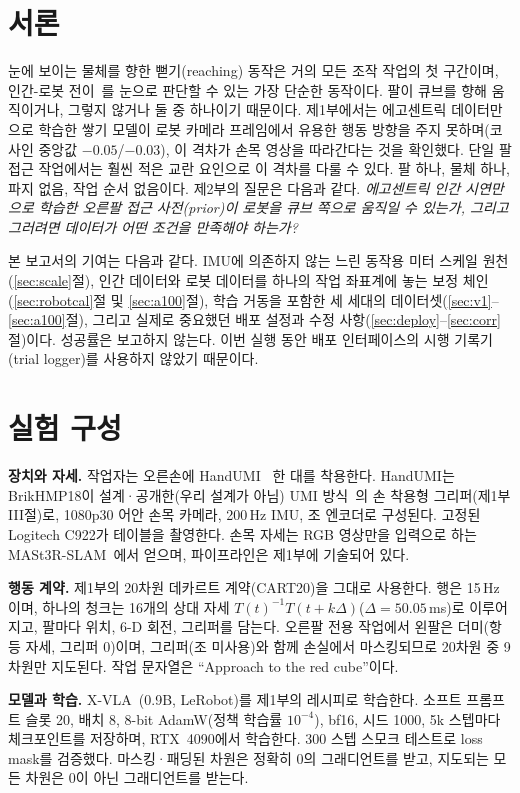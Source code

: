 \documentclass[conference,10pt]{IEEEtran}
\begin{document}
\section{서론}\label{sec:intro}
눈에 보이는 물체를 향한 뻗기(reaching) 동작은 거의 모든 조작 작업의 첫 구간이며, 인간-로봇 전이~\cite{kareer2024egomimic}를
눈으로 판단할 수 있는 가장 단순한 동작이다. 팔이 큐브를 향해 움직이거나, 그렇지 않거나 둘 중 하나이기 때문이다.
제1부에서는 에고센트릭 데이터만으로 학습한 쌓기 모델이 로봇 카메라 프레임에서 유용한 행동 방향을 주지 못하며(코사인 중앙값
$-0.05$/$-0.03$), 이 격차가 손목 영상을 따라간다는 것을 확인했다. 단일 팔 접근 작업에서는 훨씬 적은 교란 요인으로 이
격차를 다룰 수 있다. 팔 하나, 물체 하나, 파지 없음, 작업 순서 없음이다. 제2부의 질문은 다음과 같다. \emph{에고센트릭
인간 시연만으로 학습한 오른팔 접근 사전(prior)이 로봇을 큐브 쪽으로 움직일 수 있는가, 그리고 그러려면 데이터가 어떤 조건을
만족해야 하는가?}

본 보고서의 기여는 다음과 같다. IMU에 의존하지 않는 느린 동작용 미터 스케일 원천(\ref{sec:scale}절), 인간 데이터와 로봇
데이터를 하나의 작업 좌표계에 놓는 보정 체인(\ref{sec:robotcal}절 및 \ref{sec:a100}절), 학습 거동을 포함한 세 세대의
데이터셋(\ref{sec:v1}--\ref{sec:a100}절), 그리고 실제로 중요했던 배포 설정과 수정 사항(\ref{sec:deploy}--\ref{sec:corr}절)이다.
성공률은 보고하지 않는다. 이번 실행 동안 배포 인터페이스의 시행 기록기(trial logger)를 사용하지 않았기 때문이다.

\section{실험 구성}\label{sec:setup}
\textbf{장치와 자세.} 작업자는 오른손에 HandUMI~\cite{handumi_hw} 한 대를 착용한다. HandUMI는 BrikHMP18이 설계·공개한(우리 설계가 아님) UMI 방식~\cite{chi2024umi}의 손 착용형
그리퍼(제1부 III절)로, 1080p30 어안 손목 카메라, 200\,Hz IMU, 조 엔코더로 구성된다. 고정된 Logitech C922가 테이블을
촬영한다. 손목 자세는 RGB 영상만을 입력으로 하는 MASt3R-SLAM~\cite{murai2025mast3rslam}에서 얻으며, 파이프라인은
제1부에 기술되어 있다.

\textbf{행동 계약.} 제1부의 20차원 데카르트 계약(CART20)을 그대로 사용한다. 행은 15\,Hz이며, 하나의 청크는 16개의 상대
자세 $T(t)^{-1}T(t+k\Delta)$($\Delta=50.05$\,ms)로 이루어지고, 팔마다 위치, 6-D 회전, 그리퍼를 담는다. 오른팔 전용
작업에서 왼팔은 더미(항등 자세, 그리퍼 0)이며, 그리퍼(조 미사용)와 함께 손실에서 마스킹되므로 20차원 중 9차원만
지도된다. 작업 문자열은 ``Approach to the red cube''이다.

\textbf{모델과 학습.} X-VLA~\cite{zheng2025xvla}(0.9B, LeRobot)를 제1부의 레시피로 학습한다. 소프트 프롬프트 슬롯 20,
배치 8, 8-bit AdamW(정책 학습률 $10^{-4}$), bf16, 시드 1000, 5k 스텝마다 체크포인트를 저장하며, RTX~4090에서 학습한다.
300 스텝 스모크 테스트로 loss mask를 검증했다. 마스킹·패딩된 차원은 정확히 0의 그래디언트를 받고, 지도되는 모든 차원은
0이 아닌 그래디언트를 받는다.
\end{document}
